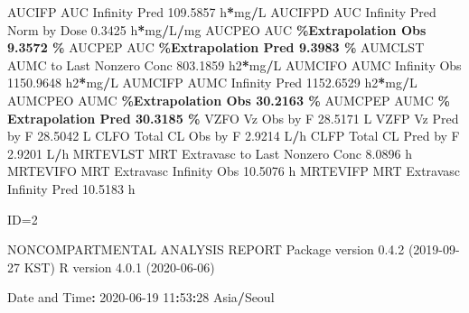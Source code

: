 \documentclass[
  10pt,
]{krantz}
\makeatletter
\newenvironment{Shaded}{\begin{snugshade}}{\end{snugshade}}
\newcommand{\DecValTok}[1]{\textcolor[rgb]{0.00,0.00,0.81}{#1}}
\newcommand{\FloatTok}[1]{\textcolor[rgb]{0.00,0.00,0.81}{#1}}
\newcommand{\NormalTok}[1]{#1}
\newcommand{\OperatorTok}[1]{\textcolor[rgb]{0.81,0.36,0.00}{\textbf{#1}}}
\newcommand{\StringTok}[1]{\textcolor[rgb]{0.31,0.60,0.02}{#1}}
\newenvironment{kframe}{%
\medskip{}
\setlength{\fboxsep}{.8em}
 \def\at@end@of@kframe{}%
 \ifinner\ifhmode%
  \def\at@end@of@kframe{\end{minipage}}%
  \begin{minipage}{\columnwidth}%
 \fi\fi%
 \def\FrameCommand##1{\hskip\@totalleftmargin \hskip-\fboxsep
 \colorbox{shadecolor}{##1}\hskip-\fboxsep
     \hskip-\linewidth \hskip-\@totalleftmargin \hskip\columnwidth}%
 \MakeFramed {\advance\hsize-\width
   \@totalleftmargin\z@ \linewidth\hsize
   \@setminipage}}%
 {\par\unskip\endMakeFramed%
 \at@end@of@kframe}
\renewenvironment{Shaded}{\begin{kframe}}{\end{kframe}}
\makeatother
\begin{document}
\begin{Shaded}
\begin{Highlighting}[]
\NormalTok{AUCIFP     AUC Infinity Pred                             }\FloatTok{109.5857}\NormalTok{ h}\OperatorTok{*}\NormalTok{mg}\OperatorTok{/}\NormalTok{L}
\NormalTok{AUCIFPD    AUC Infinity Pred Norm by Dose                  }\FloatTok{0.3425}\NormalTok{ h}\OperatorTok{*}\NormalTok{mg}\OperatorTok{/}\NormalTok{L}\OperatorTok{/}\NormalTok{mg}
\NormalTok{AUCPEO     AUC }\OperatorTok{\%Extrapolation Obs                          9.3572 \%}
\NormalTok{AUCPEP     AUC }\OperatorTok{\%Extrapolation Pred                         9.3983 \%}
\NormalTok{AUMCLST    AUMC to Last Nonzero Conc                     }\FloatTok{803.1859}\NormalTok{ h2}\OperatorTok{*}\NormalTok{mg}\OperatorTok{/}\NormalTok{L}
\NormalTok{AUMCIFO    AUMC Infinity Obs                            }\FloatTok{1150.9648}\NormalTok{ h2}\OperatorTok{*}\NormalTok{mg}\OperatorTok{/}\NormalTok{L}
\NormalTok{AUMCIFP    AUMC Infinity Pred                           }\FloatTok{1152.6529}\NormalTok{ h2}\OperatorTok{*}\NormalTok{mg}\OperatorTok{/}\NormalTok{L}
\NormalTok{AUMCPEO    AUMC }\OperatorTok{\%Extrapolation Obs                        30.2163 \%}
\NormalTok{AUMCPEP    AUMC }\OperatorTok{\% Extrapolation Pred                      30.3185 \%}
\NormalTok{VZFO       Vz Obs by F                                    }\FloatTok{28.5171}\NormalTok{ L}
\NormalTok{VZFP       Vz Pred by F                                   }\FloatTok{28.5042}\NormalTok{ L}
\NormalTok{CLFO       Total CL Obs by F                               }\FloatTok{2.9214}\NormalTok{ L}\OperatorTok{/}\NormalTok{h}
\NormalTok{CLFP       Total CL Pred by F                              }\FloatTok{2.9201}\NormalTok{ L}\OperatorTok{/}\NormalTok{h}
\NormalTok{MRTEVLST   MRT Extravasc to Last Nonzero Conc              }\FloatTok{8.0896}\NormalTok{ h}
\NormalTok{MRTEVIFO   MRT Extravasc Infinity Obs                     }\FloatTok{10.5076}\NormalTok{ h}
\NormalTok{MRTEVIFP   MRT Extravasc Infinity Pred                    }\FloatTok{10.5183}\NormalTok{ h}





\NormalTok{ID=}\DecValTok{2}

\NormalTok{                        NONCOMPARTMENTAL ANALYSIS REPORT}
\NormalTok{                       Package version }\DecValTok{0}\NormalTok{.}\FloatTok{4.2}\NormalTok{ (}\DecValTok{2019{-}09{-}27}\NormalTok{ KST)}
\NormalTok{                          R version }\DecValTok{4}\NormalTok{.}\FloatTok{0.1}\NormalTok{ (}\DecValTok{2020{-}06{-}06}\NormalTok{)}

\NormalTok{Date and Time}\OperatorTok{:}\StringTok{ }\DecValTok{2020{-}06{-}19} \DecValTok{11}\OperatorTok{:}\DecValTok{53}\OperatorTok{:}\DecValTok{28}\NormalTok{ Asia}\OperatorTok{/}\NormalTok{Seoul}


\end{Highlighting}
\end{Shaded}
\end{document}
